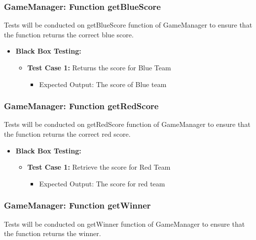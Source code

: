 \documentclass[12pt]{article}
\begin{document}
\subsubsection{GameManager: Function getBlueScore}
Tests will be conducted on getBlueScore function of GameManager to ensure that the function returns the correct blue score.

\begin{itemize}
    \item \textbf{Black Box Testing:}
    \begin{itemize}
       \item \textbf{Test Case 1:} Returns the score for Blue Team
            \begin{itemize}
            
            \item Expected Output: The score of Blue team
            \end{itemize}
    \end{itemize}
\end{itemize}

\subsubsection{GameManager: Function getRedScore}
Tests will be conducted on getRedScore function of GameManager to ensure that the function returns the correct red score.

\begin{itemize}
    \item \textbf{Black Box Testing:}
    \begin{itemize}
       \item \textbf{Test Case 1:} Retrieve the score for Red Team
            \begin{itemize}
            
            \item Expected Output: The score for red team
            \end{itemize}
    \end{itemize}
\end{itemize}

\subsubsection{GameManager: Function getWinner}
Tests will be conducted on getWinner function of GameManager to ensure that the function returns the winner.
\end{document}
